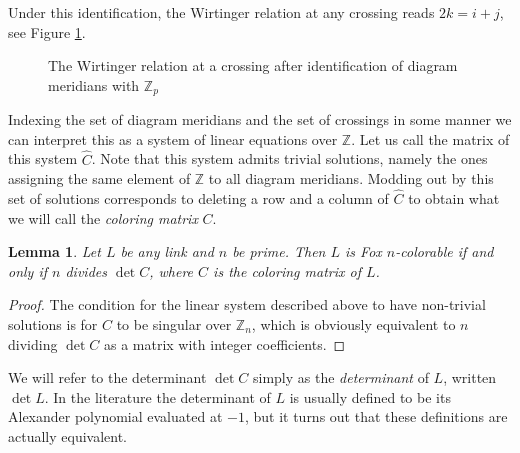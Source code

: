 \documentclass{article}
\newtheorem{lemma}[theorem]{Lemma}
\theoremstyle{definition}
\begin{document}
Under this identification, the Wirtinger relation at any crossing reads $2k = i + j$, see Figure \ref{fig:wirtinger-dihedral}.

\begin{figure}[ht]
\centering
{}
\caption{The Wirtinger relation at a crossing after identification of diagram meridians with $\mathbb{Z}_p$}
\label{fig:wirtinger-dihedral}
\end{figure}

Indexing the set of diagram meridians and the set of crossings in some manner we can interpret this as a system of linear equations over $\mathbb{Z}$. Let us call the matrix of this system $\widehat{C}$. Note that this system admits trivial solutions, namely the ones assigning the same element of $\mathbb{Z}$ to all diagram meridians. Modding out by this set of solutions corresponds to deleting a row and a column of $\widehat{C}$ to obtain what we will call the \textit{coloring matrix} $C$.

\begin{lemma}
Let $L$ be any link and $n$ be prime. Then $L$ is Fox $n$-colorable if and only if $n$ divides $\det C$, where $C$ is the coloring matrix of $L$.
\end{lemma}

\begin{proof}
The condition for the linear system described above to have non-trivial solutions is for $C$ to be singular over $\mathbb{Z}_n$, which is obviously equivalent to $n$ dividing $\det C$ as a matrix with integer coefficients.
\end{proof}

We will refer to the determinant $\det C$ simply as the \textit{determinant} of $L$, written $\det L$. In the literature the determinant of $L$ is usually defined to be its Alexander polynomial evaluated at $-1$, but it turns out that these definitions are actually equivalent.
\end{document}

